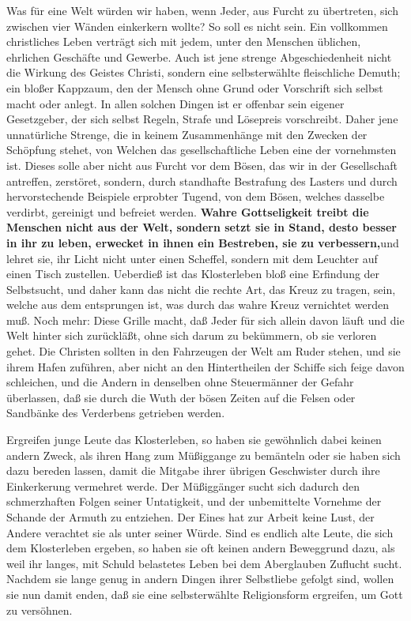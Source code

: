 \medskip

Was für eine Welt würden wir haben, wenn Jeder, aus Furcht zu übertreten, sich
zwischen vier Wänden einkerkern wollte? So soll es nicht sein. Ein vollkommen
christliches Leben verträgt sich mit jedem, unter den Menschen üblichen,
ehrlichen Geschäfte und Gewerbe. Auch ist jene strenge Abgeschiedenheit nicht
die Wirkung des Geistes Christi, sondern eine selbsterwählte fleischliche
Demuth; ein bloßer Kappzaum, den der Mensch ohne Grund oder Vorschrift  sich
selbst macht oder anlegt. In allen solchen Dingen ist er offenbar sein eigener
Gesetzgeber, der sich selbst Regeln, Strafe und Lösepreis vorschreibt. Daher
jene unnatürliche Strenge, die in keinem Zusammenhänge mit den Zwecken der
Schöpfung stehet, von Welchen das gesellschaftliche Leben eine der vornehmsten
ist. Dieses solle aber nicht aus Furcht vor dem Bösen, das wir in der
Gesellschaft antreffen, zerstöret, sondern, durch standhafte Bestrafung des
Lasters und durch hervorstechende Beispiele erprobter Tugend, von dem Bösen,
welches dasselbe verdirbt, gereinigt und befreiet werden. \textbf{Wahre
Gottseligkeit
treibt die Menschen nicht aus der Welt, sondern setzt sie in Stand, desto besser
in ihr zu leben, erwecket in ihnen ein Bestreben, sie zu verbessern,}und lehret
sie, ihr Licht nicht unter einen Scheffel, sondern mit dem Leuchter auf einen
Tisch zustellen. Ueberdieß ist das Klosterleben bloß eine Erfindung der
Selbstsucht, und daher kann das nicht die rechte Art, das Kreuz zu tragen, sein,
welche aus dem entsprungen ist, was durch das wahre Kreuz vernichtet werden muß.
Noch mehr: Diese Grille macht, daß Jeder für sich allein davon läuft und die
Welt hinter sich zurückläßt, ohne sich darum zu bekümmern, ob sie verloren
gehet. Die Christen sollten in den Fahrzeugen der Welt am Ruder stehen, und sie
ihrem Hafen zuführen, aber nicht an den Hintertheilen der Schiffe sich feige
davon schleichen, und die Andern in denselben ohne Steuermänner der Gefahr
überlassen, daß sie durch die Wuth der bösen Zeiten auf die Felsen oder
Sandbänke des Verderbens getrieben werden.

\medskip

Ergreifen junge Leute das Klosterleben, so haben sie gewöhnlich dabei keinen
andern Zweck, als ihren Hang zum Müßiggange zu bemänteln oder sie haben sich
dazu bereden lassen, damit die Mitgabe ihrer übrigen Geschwister durch ihre
Einkerkerung vermehret werde. Der Müßiggänger sucht sich dadurch den
schmerzhaften Folgen seiner Untatigkeit, und der unbemittelte Vornehme der
Schande der Armuth zu entziehen. Der Eines hat zur Arbeit keine Lust, der Andere
verachtet sie als unter seiner Würde. Sind es endlich alte Leute, die sich dem
Klosterleben ergeben, so haben sie oft keinen andern Beweggrund dazu, als weil
ihr langes, mit Schuld belastetes Leben bei dem Aberglauben Zuflucht sucht.
Nachdem sie lange genug in andern Dingen ihrer Selbstliebe gefolgt sind, wollen
sie nun damit enden, daß sie eine selbsterwählte Religionsform ergreifen, um
Gott zu versöhnen.

